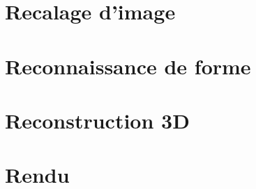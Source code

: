 \section{Recalage d'image \label{registration}~\cite{greenwade93}}



\section{Reconnaissance de forme}
\section{Reconstruction 3D}
\section{Rendu}